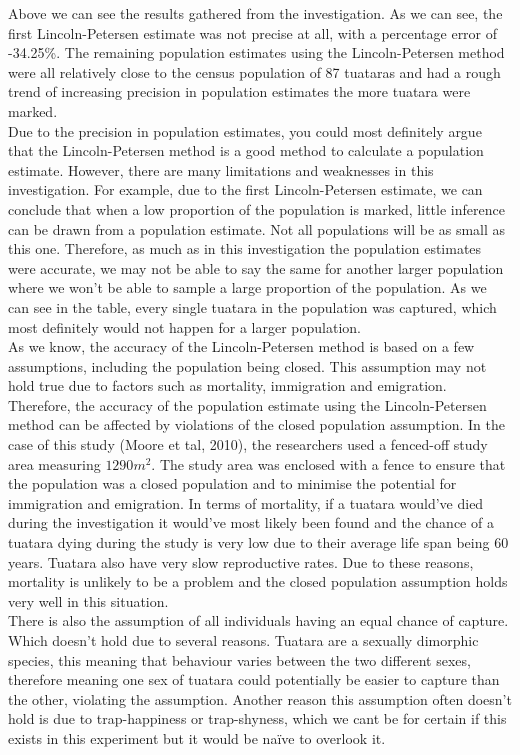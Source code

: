 \documentclass[,oneside]{article}
\numberwithin{equation}{section}
\begin{document}



Above we can see the results gathered from the investigation. As we can see, the first Lincoln-Petersen estimate was not precise at all, with a percentage error of -34.25\%. The remaining population estimates using the Lincoln-Petersen method were all relatively close to the census population of 87 tuataras and had a rough trend of increasing precision in population estimates the more tuatara were marked.\\
Due to the precision in population estimates, you could most definitely argue that the Lincoln-Petersen method is a good method to calculate a population estimate. However, there are many limitations and weaknesses in this investigation. For example, due to the first Lincoln-Petersen estimate, we can conclude that when a low proportion of the population is marked, little inference can be drawn from a population estimate. Not all populations will be as small as this one. Therefore, as much as in this investigation the population estimates were accurate, we may not be able to say the same for another larger population where we won’t be able to sample a large proportion of the population. As we can see in the table, every single tuatara in the population was captured, which most definitely would not happen for a larger population.\\
As we know, the accuracy of the Lincoln-Petersen method is based on a few assumptions, including the population being closed. This assumption may not hold true due to factors such as mortality, immigration and emigration. Therefore, the accuracy of the population estimate using the Lincoln-Petersen method can be affected by violations of the closed population assumption. In the case of this study (Moore et tal, 2010), the researchers used a fenced-off study area measuring $1290m^2$. The study area was enclosed with a fence to ensure that the population was a closed population and to minimise the potential for immigration and emigration. In terms of mortality, if a tuatara would’ve died during the investigation it would’ve most likely been found and the chance of a tuatara dying during the study is very low due to their average life span being 60 years. Tuatara also have very slow reproductive rates. Due to these reasons, mortality is unlikely to be a problem and the closed population assumption holds very well in this situation.\\
There is also the assumption of all individuals having an equal chance of capture. Which doesn’t hold due to several reasons. Tuatara are a sexually dimorphic species, this meaning that behaviour varies between the two different sexes, therefore meaning one sex of tuatara could potentially be easier to capture than the other, violating the assumption. Another reason this assumption often doesn’t hold is due to trap-happiness or trap-shyness, which we cant be for certain if this exists in this experiment but it would be naïve to overlook it. \\
\end{document}
